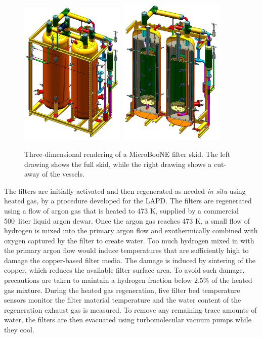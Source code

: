 \begin{figure}
\centering 
\includegraphics[width=0.45\textwidth]{figures/cryo-filter-skid}
\includegraphics[width=0.45\textwidth]{figures/cryo-filter-skid-cutaway}
\caption{Three-dimensional rendering of a MicroBooNE filter skid.  The left drawing shows the full skid, while the right drawing shows a cut-away of the vessels.}
\label{filters}
\end{figure}


The filters are initially activated and then regenerated as needed {\it in situ} using heated gas, by a procedure developed for the LAPD.  The filters are regenerated using a flow of argon gas that is heated to 473 K, supplied by a commercial 500~liter liquid argon dewar.   Once the argon gas reaches 473 K, a small flow of hydrogen is mixed into the primary argon flow and exothermically combined with oxygen captured by the filter to create water.  Too much hydrogen mixed in with the primary argon flow would induce temperatures that are sufficiently high to damage the copper-based filter media.  The damage is induced by sintering of the copper, which reduces the available filter surface area.  To avoid such damage, precautions are taken to maintain a hydrogen fraction below 2.5\% of the heated gas mixture.  During the heated gas regeneration, five filter bed temperature sensors monitor the filter material temperature and the water content of the regeneration exhaust gas is measured.  To remove any remaining trace amounts of water, the filters are then evacuated using turbomolecular vacuum pumps while they cool. 


